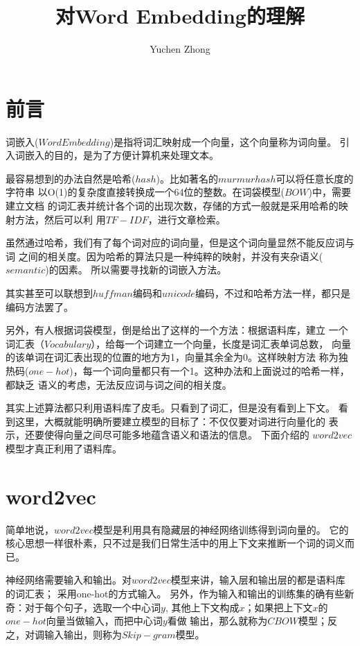 \documentclass{article}
\title{对Word Embedding的理解}
\author{Yuchen Zhong}
\date{}
\begin{document}
        \maketitle
        \section{前言}
        词嵌入($Word Embedding$)是指将词汇映射成一个向量，这个向量称为词向量。
        引入词嵌入的目的，是为了方便计算机来处理文本。
        
        最容易想到的办法自然是哈希($hash$)。比如著名的$murmurhash$可以将任意长度的字符串
        以O(1)的复杂度直接转换成一个64位的整数。在词袋模型($BOW$)中，需要建立文档
        的词汇表并统计各个词的出现次数，存储的方式一般就是采用哈希的映射方法，然后可以利
        用$TF-IDF$，进行文章检索。

        虽然通过哈希，我们有了每个词对应的词向量，但是这个词向量显然不能反应词与词
        之间的相关度。因为哈希的算法只是一种纯粹的映射，并没有夹杂语义($semantic$)的因素。
        所以需要寻找新的词嵌入方法。

        其实甚至可以联想到$huffman$编码和$unicode$编码，不过和哈希方法一样，都只是编码方法罢了。

        另外，有人根据词袋模型，倒是给出了这样的一个方法：根据语料库，建立
        一个词汇表（$Vocabulary$），给每一个词建立一个向量，长度是词汇表单词总数，
        向量的该单词在词汇表出现的位置的地方为1，向量其余全为0。这样映射方法
        称为独热码($one-hot$)，每一个词向量都只有一个1。这种办法和上面说过的哈希一样，都缺乏
        语义的考虑，无法反应词与词之间的相关度。

        其实上述算法都只利用语料库了皮毛。只看到了词汇，但是没有看到上下文。
        看到这里，大概就能明确所要建立模型的目标了：不仅仅要对词进行向量化的
        表示，还要使得向量之间尽可能多地蕴含语义和语法的信息。
        下面介绍的
        $word2vec$模型才真正利用了语料库。

        \section{word2vec}
        简单地说，$word2vec$模型是利用具有隐藏层的神经网络训练得到词向量的。
        它的核心思想一样很朴素，只不过是我们日常生活中的用上下文来推断一个词的词义而已。

        神经网络需要输入和输出。对$word2vec$模型来讲，输入层和输出层的都是语料库的词汇表；
        采用one-hot的方式输入。
        另外，作为输入和输出的训练集的确有些新奇：对于每个句子，选取一个中心词$y$,
        其他上下文构成$x$；如果把上下文$x$的$one-hot$向量当做输入，而把中心词$y$看做
        输出，那么就称为$CBOW$模型；反之，对调输入输出，则称为$Skip-gram$模型。
\end{document}
